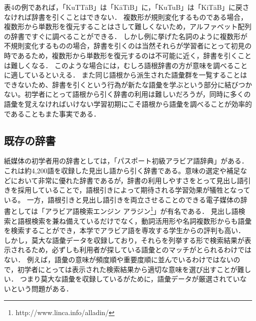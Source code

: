 \documentclass[technicalreport]{ieicej}
\begin{document}
表4の例であれば，「KuTTāB」は「KāTiB」に，「KuTuB」は「KiTāB」に戻さなければ辞書を引くことはできない．
複数形が規則変化するものである場合，複数形から単数形を復元することはさして難しくないため，アルファベット配列の辞書ですぐに調べることができる．
しかし例に挙げた名詞のように複数形が不規則変化するものの場合，辞書を引くのは当然それらが学習者にとって初見の時であるため，複数形から単数形を復元するのは不可能に近く，辞書を引くことは難しくなる．
このような場合には，むしろ語根辞書の方が意味を調べることに適しているといえる．
また同じ語根から派生された語彙群を一覧することはできないため、辞書を引くという行為が新たな語彙を学ぶという部分に結びつかない。初学者にとって語根から引く辞書の利用は難しいだろうが，同時に多くの語彙を覚えなければいけない学習初期にこそ語根から語彙を調べることが効率的であることもまた事実である．

\subsection{既存の辞書}
紙媒体の初学者用の辞書としては，「パスポート初級アラビア語辞典」がある．
これは約4,200語を収録した見出し語から引く辞書である。意味の選定や補足などにおいて非常に優れた辞書であるが，辞書の利用しやすさをとって見出し語引きを採用していることで，語根引きによって期待される学習効果が犠牲となっている。
一方，語根引きと見出し語引きを両立させることのできる電子媒体の辞書としては「アラビア語検索エンジン アラジン\footnote{http://www.linca.info/alladin/}」が有名である．
見出し語検索と語根検索を兼ね備えているだけでなく，動詞活用形や名詞複数形からも語彙を検索することができ，本学でアラビア語を専攻する学生からの評判も高い．
しかし，莫大な語彙データを収録しており，それらを列挙する形で検索結果が表示されるため，必ずしも利用者が探している語彙とのマッチがとられるわけではない．
例えば，語彙の意味が頻度順や重要度順に並んでいるわけではないので，初学者にとっては表示された検索結果から適切な意味を選び出すことが難しい．
つまり莫大な語彙を収録しているがために，語彙データが厳選されていないという問題がある．
\end{document}
